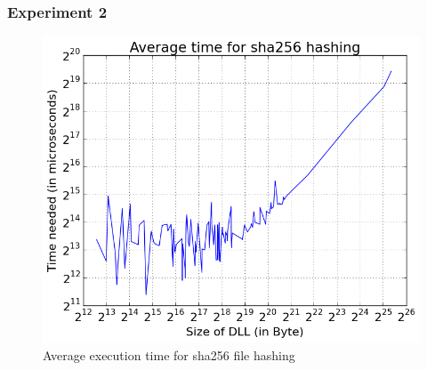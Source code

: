 \subsubsection{Experiment 2}
\begin{figure}[htbp]
	\centering
    \includegraphics[width=\textwidth,height=0.45\textheight,keepaspectratio]{Evaluation/experiment2/result.png}
    \caption{Average execution time for sha256 file hashing}
    \label{fig:ex2_result}
\end{figure}
